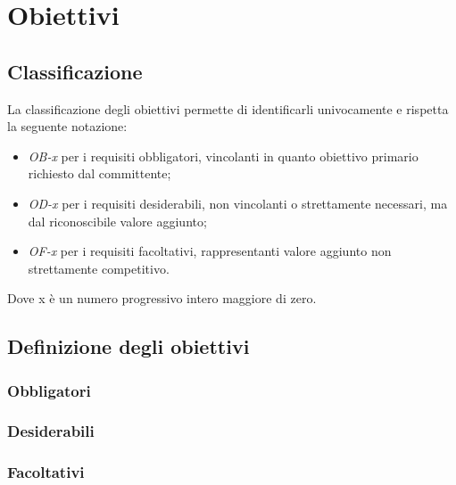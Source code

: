 \section{Obiettivi}
\subsection{Classificazione}
La classificazione degli obiettivi permette di identificarli univocamente e rispetta la seguente notazione:
\begin{itemize}
	\item \textit{OB-x} per i requisiti obbligatori, vincolanti in quanto obiettivo primario richiesto dal committente;
	\item \textit{OD-x} per i requisiti desiderabili, non vincolanti o strettamente necessari,
		  ma dal riconoscibile valore aggiunto;
	\item \textit{OF-x} per i requisiti facoltativi, rappresentanti valore aggiunto non strettamente competitivo.
\end{itemize}
Dove x è un numero progressivo intero maggiore di zero.

\subsection{Definizione degli obiettivi}
\subsubsection*{Obbligatori}
	\begin{itemize}
		\obiettiviObbligatori
	\end{itemize}
\subsubsection*{Desiderabili} 
	\begin{itemize}
		\obiettiviDesiderabili
	\end{itemize}
\subsubsection*{Facoltativi}
	\begin{itemize}
		\obiettiviFacoltativi
	\end{itemize} 

\newpage